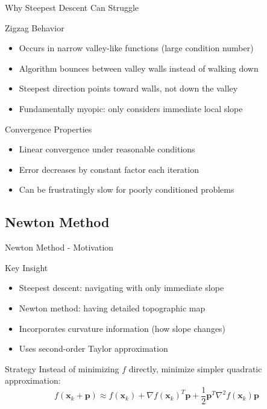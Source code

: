 \documentclass[aspectratio=1610]{beamer}
\begin{document}
\begin{frame}{Why Steepest Descent Can Struggle}
  \begin{block}{Zigzag Behavior}
    \begin{itemize}
      \item Occurs in narrow valley-like functions (large condition number)
      \item Algorithm bounces between valley walls instead of walking down
      \item Steepest direction points toward walls, not down the valley
      \item Fundamentally myopic: only considers immediate local slope
    \end{itemize}
  \end{block}
  
  \vspace{0.5cm}
  \begin{block}{Convergence Properties}
    \begin{itemize}
      \item Linear convergence under reasonable conditions
      \item Error decreases by constant factor each iteration
      \item Can be frustratingly slow for poorly conditioned problems
    \end{itemize}
  \end{block}
\end{frame}

\subsection{Newton Method}

\begin{frame}{Newton Method - Motivation}
  \begin{block}{Key Insight}
    \begin{itemize}
      \item Steepest descent: navigating with only immediate slope
      \item Newton method: having detailed topographic map
      \item Incorporates curvature information (how slope changes)
      \item Uses second-order Taylor approximation
    \end{itemize}
  \end{block}
  
  \vspace{0.5cm}
  \begin{block}{Strategy}
    Instead of minimizing $f$ directly, minimize simpler quadratic approximation:
    $$f(\mathbf{x}_k + \mathbf{p}) \approx f(\mathbf{x}_k) + \nabla f(\mathbf{x}_k)^T\mathbf{p} + \frac{1}{2}\mathbf{p}^T\nabla^2 f(\mathbf{x}_k)\mathbf{p}$$
  \end{block}
\end{frame}
\end{document}
